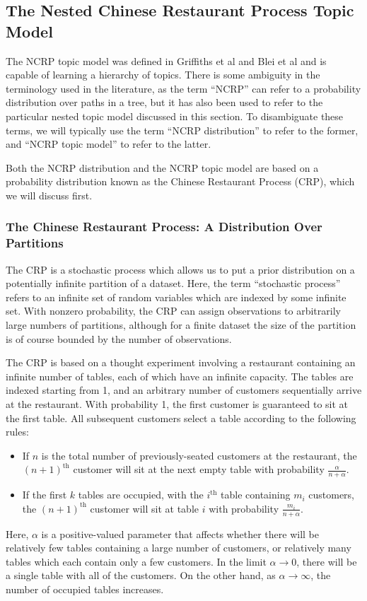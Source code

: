 \documentclass{article}
\newcommand{\nth}{^{\text{th}}}
\begin{document}
\subsection{The Nested Chinese Restaurant Process Topic Model}

The NCRP topic model was defined in Griffiths et al \cite{griffiths2004hierarchical} and Blei et al \cite{blei2010ncrp} and is capable of learning a hierarchy of topics.
There is some ambiguity in the terminology used in the literature, as the term ``NCRP'' can refer to a probability distribution over paths in a tree, but it has also been used to refer to the particular nested topic model discussed in this section.
To disambiguate these terms, we will typically use the term ``NCRP distribution'' to refer to the former, and ``NCRP topic model'' to refer to the latter.

Both the NCRP distribution and the NCRP topic model are based on a probability distribution known as the Chinese Restaurant Process (CRP), which we will discuss first.

\subsubsection{The Chinese Restaurant Process: A Distribution Over Partitions}

The CRP is a stochastic process which allows us to put a prior distribution on a potentially infinite partition of a dataset.
Here, the term ``stochastic process'' refers to an infinite set of random variables which are indexed by some infinite set.
With nonzero probability, the CRP can assign observations to arbitrarily large numbers of partitions, although for a finite dataset the size of the partition is of course bounded by the number of observations.

The CRP is based on a thought experiment involving a restaurant containing an infinite number of tables, each of which have an infinite capacity.
The tables are indexed starting from 1, and an arbitrary number of customers sequentially arrive at the restaurant.
With probability 1, the first customer is guaranteed to sit at the first table.
All subsequent customers select a table according to the following rules:
\begin{itemize}
\item If $n$ is the total number of previously-seated customers at the restaurant, the $(n+1)\nth$ customer will sit at the next empty table with probability $\frac{\alpha}{n + \alpha}$.
\item If the first $k$ tables are occupied, with the $i\nth$ table containing $m_i$ customers, the $(n+1)\nth$ customer will sit at table $i$ with probability $\frac{m_i}{n+\alpha}$.
\end{itemize}
Here, $\alpha$ is a positive-valued parameter that affects whether there will be relatively few tables containing a large number of customers, or relatively many tables which each contain only a few customers.
In the limit $\alpha \to 0$, there will be a single table with all of the customers.
On the other hand, as $\alpha \to \infty$, the number of occupied tables increases.
\end{document}
